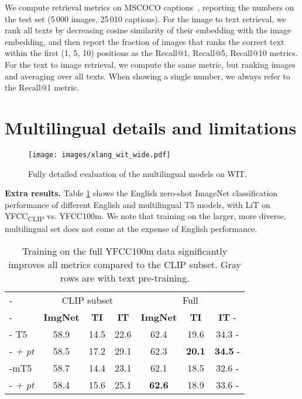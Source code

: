 \documentclass[10pt,twocolumn,letterpaper]{article}
\def \lit {LiT\xspace}
\begin{document}
We compute retrieval metrics on MSCOCO captions~\cite{mscoco}, reporting the numbers on the test set (5\,000 images, 25\,010 captions).
For the image to text retrieval, we rank all texts by decreasing cosine similarity of their embedding with the image embedding, and then report the fraction of images that ranks the correct text within the first (1, 5, 10) positions as the Recall@1, Recall@5, Recall@10 metrics.
For the text to image retrieval, we compute the same metric, but ranking images and averaging over all texts.
When showing a single number, we always refer to the Recall@1 metric.


\section{Multilingual details and limitations}
\label{appendix:multilingual_details}

\begin{figure*}[t]
    \centering
    \texttt{[image: images/xlang\_wit\_wide.pdf]}
    \caption{Fully detailed evaluation of the multilingual models on WIT.}
    \label{fig:xlang_wit_wide}
\end{figure*}

\textbf{Extra results.}
Table \ref{tab:yfcc_xlang} shows the English zero-shot ImageNet classification performance of different English and multilingual T5 models, with \lit{} on YFCC\textsubscript{CLIP} vs. YFCC100m. We note that training on the larger, more diverse, multilingual set does not come at the expense of English performance.
\begin{table}
\centering
\begin{tabular}{>{\kern-\tabcolsep}lcccccc<{\kern-\tabcolsep}}
\toprule
 & \multicolumn{3}{c}{CLIP subset} & \multicolumn{3}{c}{Full} \\
{} &    \textbf{ImgNet} &   \textbf{TI} &   \textbf{IT} & \textbf{ImgNet} &   \textbf{TI} &   \textbf{IT} \\
\midrule
T5 &        58.9 &  14.5 &  22.6 &     62.4 &  19.6 &  34.3 \\
\rowcolor{gray!20} 
\textit{ + pt} &        58.5 &  17.2 &  29.1 &     62.3 &  \textbf{20.1} &  \textbf{34.5} \\
mT5       &        58.7 &  14.4 &  23.1 &     62.1 &  18.5 &  32.6 \\
\rowcolor{gray!20}
\textit{ + pt} &        58.4 &  15.6 &  25.1 &     \textbf{62.6} &  18.9 &  33.6 \\
\bottomrule\end{tabular}
\caption{Training on the full YFCC100m data significantly improves all metrics compared to the CLIP subset. Gray rows are with text pre-training.}
\label{tab:yfcc_xlang}
\end{table}
\end{document}
